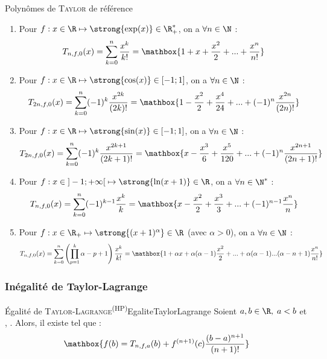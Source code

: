 \documentclass[12pt,a4paper]{report}
\begin{document}
\begin{proposition}{Polynômes de \textsc{Taylor} de référence}{}
    \begin{enumerate}
        \item Pour $f : x \in \R \mapsto \strong{\exp(x)} \in \R^*_+$, on a $\forall n \in \N$ :
        $$ T_{n,f,0} (x) = \sum_{k=0}^{n} \dfrac{x^k}{k!} = \mathbox{1 + x + \dfrac{x^2}{2} + ... + \dfrac{x^n}{n!}} $$ 
        \item Pour $f : x \in \R \mapsto \strong{\cos(x)} \in [-1 ; 1]$, on a $\forall n \in \N$ :
        $$ T_{2n,f,0} (x) = \sum_{k=0}^{n} (-1)^k \dfrac{x^{2k}}{(2k)!} = \mathbox{1 - \dfrac{x^2}{2} + \dfrac{x^4}{24} + ... + (-1)^n \dfrac{x^{2n}}{(2n)!}} $$
        \item Pour $f : x \in \R \mapsto \strong{\sin(x)} \in [-1 ; 1]$, on a $\forall n \in \N$ :
        $$ T_{2n,f,0} (x) = \sum_{k=0}^{n} (-1)^k \dfrac{x^{2k+1}}{(2k+1)!} = \mathbox{x - \dfrac{x^3}{6} + \dfrac{x^5}{120} + ... + (-1)^n \dfrac{x^{2n+1}}{(2n+1)!}} $$
        \item Pour $f : x \in \; ]-1 ; +\infty[ \; \mapsto \strong{\ln(x + 1)} \in \R$, on a $\forall n \in \N^*$ :
        $$ T_{n,f,0} (x) = \sum_{k=0}^{n} (-1)^{k-1} \dfrac{x^k}{k} = \mathbox{x - \dfrac{x^2}{2} + \dfrac{x^3}{3} + ... + (-1)^{n-1} \dfrac{x^n}{n}} $$ 
        \item Pour $f : x \in \R_+ \mapsto \strong{(x + 1)^\alpha} \in \R$ (avec $\alpha > 0$), on a $\forall n \in \N$ :
        $$ T_{n,f,0} (x) = \sum_{k=0}^{n} \left( \prod_{p=1}^k \alpha - p + 1 \right) \dfrac{x^k}{k!} =  \mathbox{1 + \alpha x + \alpha(\alpha-1)\dfrac{x^2}{2} + ... + \alpha(\alpha-1)...(\alpha-n+1)\dfrac{x^n}{n!}} $$
    \end{enumerate}
    
\end{proposition}


\subsubsection{Inégalité de Taylor-Lagrange}

\begin{theoreme}{Égalité de \textsc{Taylor-Lagrange}\textsuperscript{(HP)}}{EgaliteTaylorLagrange}
Soient $a,b \in \R, \; a < b$ et , \strong{$f \in \mathcal{D}^{n+1} \left(]a,b[, \R\right)$}. Alors, il existe \strong{$c \in ]a,b[$} tel que :
$$ \mathbox{f(b) = T_{n,f,a} (b) + f^{(n+1)}(c) \dfrac{(b - a)^{n+1}}{(n+1)!}} $$
\end{theoreme}
\end{document}
